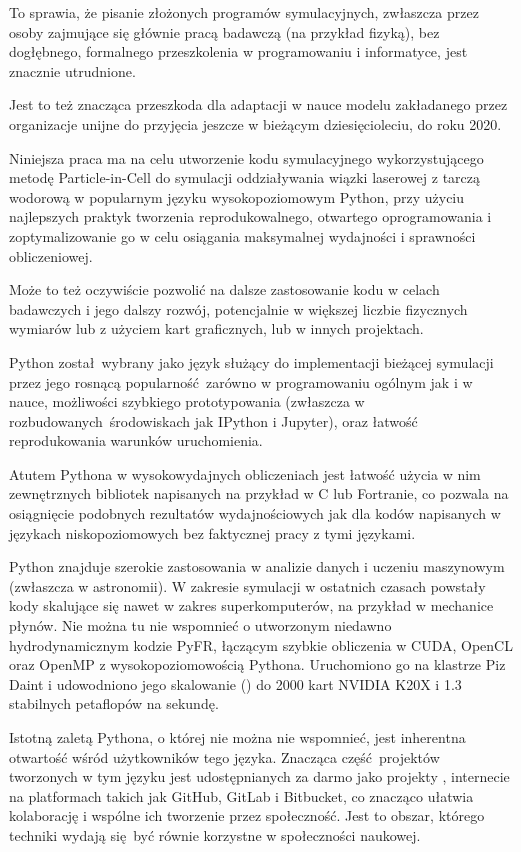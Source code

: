 To sprawia, że pisanie złożonych programów symulacyjnych, zwłaszcza przez osoby
zajmujące się głównie pracą badawczą (na przykład fizyką), bez dogłębnego, formalnego przeszkolenia
w programowaniu i informatyce, jest znacznie utrudnione.

Jest to też znacząca przeszkoda dla adaptacji
w nauce modelu  zakładanego przez organizacje unijne
do przyjęcia jeszcze w bieżącym dziesięcioleciu, do roku 2020.

Niniejsza praca ma na celu utworzenie kodu symulacyjnego wykorzystującego metodę Particle-in-Cell
do symulacji oddziaływania wiązki laserowej z tarczą wodorową w popularnym języku
wysokopoziomowym Python, przy użyciu najlepszych praktyk tworzenia reprodukowalnego, otwartego oprogramowania
i zoptymalizowanie go w celu osiągania maksymalnej wydajności i sprawności obliczeniowej.

Może to też oczywiście pozwolić na dalsze
zastosowanie kodu w celach badawczych i jego dalszy rozwój, potencjalnie w większej
liczbie fizycznych wymiarów lub z
użyciem kart graficznych,
lub w innych projektach.

Python został wybrany jako język służący do implementacji bieżącej symulacji
przez jego rosnącą popularność zarówno w programowaniu ogólnym jak i w nauce,
możliwości szybkiego prototypowania (zwłaszcza w rozbudowanych środowiskach jak
IPython\cite{ipython} i Jupyter\cite{jupyter}), oraz łatwość reprodukowania
warunków uruchomienia.

Atutem Pythona w wysokowydajnych obliczeniach jest łatwość użycia w
nim zewnętrznych bibliotek napisanych na przykład w C lub Fortranie, co
pozwala na osiągnięcie podobnych rezultatów wydajnościowych jak dla kodów
napisanych w językach niskopoziomowych bez faktycznej pracy z tymi
językami.

Python znajduje szerokie zastosowania w analizie danych i uczeniu maszynowym
(zwłaszcza w astronomii\cite{astropy}). W zakresie symulacji w ostatnich czasach powstały
kody skalujące się nawet w zakres superkomputerów, na przykład w mechanice
płynów.  Nie można tu nie wspomnieć o utworzonym niedawno hydrodynamicznym kodzie
PyFR, łączącym szybkie obliczenia w CUDA, OpenCL oraz OpenMP z wysokopoziomowością Pythona. Uruchomiono go na klastrze Piz Daint
i udowodniono jego skalowanie () do 2000 kart NVIDIA K20X i 1.3 stabilnych petaflopów na sekundę.
\cite{pyfr}\cite{pyfr-euroscipy}

Istotną zaletą Pythona, o której nie można nie wspomnieć, jest inherentna
otwartość wśród użytkowników tego języka. Znacząca część projektów tworzonych w
tym języku jest udostępnianych za darmo jako projekty ,
internecie na platformach takich jak GitHub, GitLab i Bitbucket, co znacząco
ułatwia kolaborację i wspólne ich tworzenie przez społeczność.  Jest to obszar,
którego techniki wydają się być równie korzystne w społeczności naukowej.

